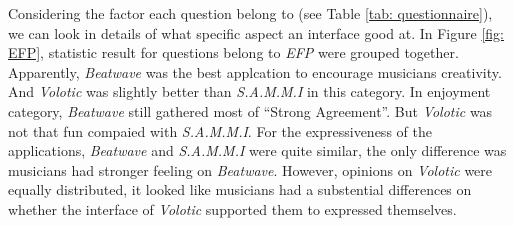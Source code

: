 Considering the factor each question belong to (see Table \ref{tab: questionnaire}), we can look in details of what specific aspect an interface good at. In Figure \ref{fig: EFP}, statistic result for questions belong to \textit{EFP} were grouped together. Apparently, \textit{Beatwave} was the best applcation to encourage musicians creativity. And \textit{Volotic} was slightly better than \textit{S.A.M.M.I} in this category. In enjoyment category, \textit{Beatwave} still gathered most of \textquotedblleft{Strong Agreement}\textquotedblright. But \textit{Volotic} was not that fun compaied with \textit{S.A.M.M.I}. For the expressiveness of the applications, \textit{Beatwave} and \textit{S.A.M.M.I} were quite similar, the only difference was musicians had stronger feeling on \textit{Beatwave}. However, opinions on \textit{Volotic} were equally distributed, it looked like musicians had a substential differences on whether the interface of \textit{Volotic} supported them to expressed themselves.
%
%
%
%


\clearpage
